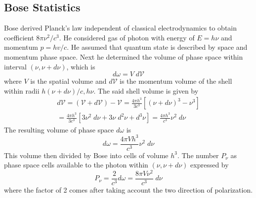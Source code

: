 \documentclass[../../../Main.tex]{subfiles}
\begin{document}
\subsection*{Bose Statistics}
Bose derived Planck's law independent of classical electrodynamics to obtain coefficient $8\pi \nu^2/c^3$. He considered gas of photon with energy of $E=h\nu$ and momentum $p=hv/c$. He assumed that quantum state is described by space and momentum phase space. Next he determined the volume of phase space within interval $(\nu,\nu+d\nu)$, which is
\begin{equation*}
    d\omega=V\;d\mathcal{V}
\end{equation*}
where $V$ is the spatial volume and $d\mathcal{V}$ is the momentum volume of the shell within radii $h(\nu+d\nu)/c,h\nu$. The said shell volume is given by
\begin{multline*}
    d\mathcal{V}=(\mathcal{V}+d\mathcal{V})-\mathcal{V}=\frac{4\pi h^3}{3c^3}\left[(\nu+d\nu)^3-\nu^3\right] \\= \frac{4\pi h^3}{3c^3}\left[3\nu^2\;d\nu+3\nu\;d^2\nu+d^3\nu\right]=\frac{4\pi h^3}{c^3}\nu^2\;d\nu
\end{multline*}
The resulting volume of phase space $d\omega$ is
\begin{equation*}
    d\omega=\frac{4\pi V h^3}{c^3}\nu^2\;d\nu
\end{equation*}
This volume then divided by Bose into cells of volume $h^3$. The number $P_\nu$ as phase space cells available to the photon within $(\nu,\nu+d\nu)$ expressed by
\begin{equation*}
    P_\nu=\frac{2}{c^3}d\omega=\frac{8\pi V\nu^2}{c^3}\;d\nu
\end{equation*}
where the factor of 2 comes after taking account the two direction of polarization. 
\end{document}
